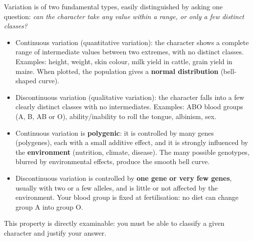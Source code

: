\documentclass[11pt]{article}
\newcommand{\cle}[1]{{\popxbold\color{popdark}#1}}
\begin{document}
Variation is of two fundamental types, easily distinguished by asking one question: \emph{can the character take any value within a range, or only a few distinct classes?}

\begin{definition}
\begin{itemize}
\item \cle{Continuous variation} (quantitative variation): the character shows a complete range of intermediate values between two extremes, with no distinct classes. Examples: height, weight, skin colour, milk yield in cattle, grain yield in maize. When plotted, the population gives a \textbf{normal distribution} (bell-shaped curve).
\item \cle{Discontinuous variation} (qualitative variation): the character falls into a few clearly distinct classes with no intermediates. Examples: ABO blood groups (A, B, AB or O), ability/inability to roll the tongue, albinism, sex.
\end{itemize}
\end{definition}

\begin{propriete}
\begin{itemize}
\item Continuous variation is \textbf{polygenic}: it is controlled by many genes (polygenes), each with a small additive effect, and it is strongly influenced by the \textbf{environment} (nutrition, climate, disease). The many possible genotypes, blurred by environmental effects, produce the smooth bell curve.
\item Discontinuous variation is controlled by \textbf{one gene or very few genes}, usually with two or a few alleles, and is little or not affected by the environment. Your blood group is fixed at fertilisation: no diet can change group A into group O.
\end{itemize}
This property is directly examinable: you must be able to classify a given character and justify your answer.
\end{propriete}
\end{document}
